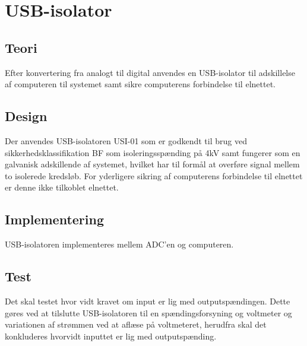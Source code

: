 \section{USB-isolator}
\subsection{Teori}
Efter konvertering fra analogt til digital anvendes en USB-isolator til adskillelse af computeren til systemet samt sikre computerens forbindelse til elnettet. 

\subsection{Design}
Der anvendes USB-isolatoren USI-01 som er godkendt til brug ved sikkerhedsklassifikation BF som isoleringsspænding på 4kV samt fungerer som en galvanisk adskillende af systemet, hvilket har til formål at overføre signal mellem to isolerede kredsløb. For yderligere sikring af computerens forbindelse til elnettet er denne ikke tilkoblet elnettet. 

\subsection{Implementering}
USB-isolatoren implementeres mellem ADC'en og computeren. 

\subsection{Test}
Det skal testet hvor vidt kravet om input er lig med outputspændingen. Dette gøres ved at tilslutte USB-isolatoren til en spændingsforsyning og voltmeter og variationen af strømmen ved at aflæse på voltmeteret, herudfra skal det konkluderes hvorvidt inputtet er lig med outputspænding. 
